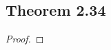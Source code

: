 \documentclass[../../main.tex]{subfiles}
\begin{document}
\subsection{Theorem 2.34}
\begin{wts}

\end{wts}
\begin{proof}

\end{proof}
\end{document}
